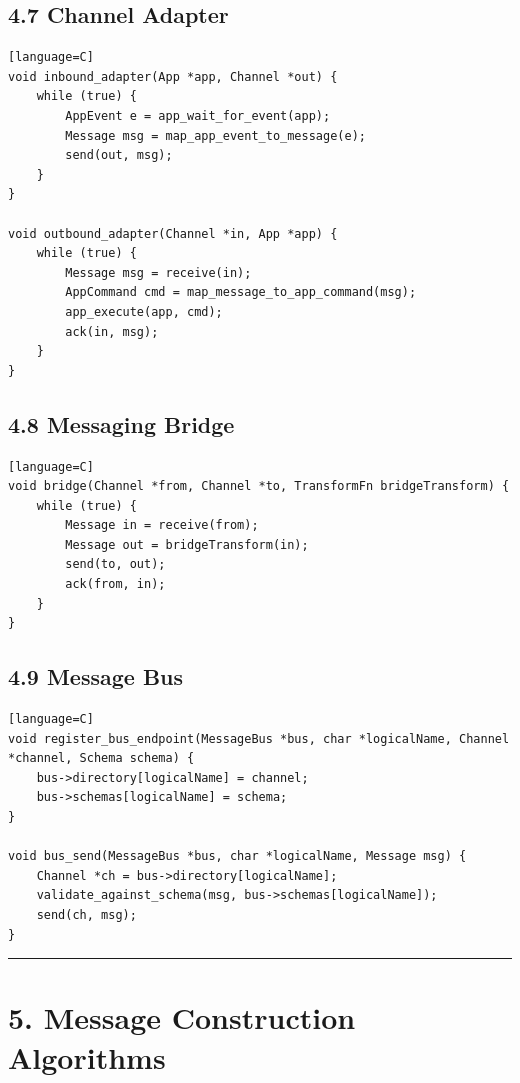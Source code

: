 \documentclass[11pt]{article}
\begin{document}
\subsection{4.7 Channel Adapter}\label{channel-adapter}

\begin{verbatim}[language=C]
void inbound_adapter(App *app, Channel *out) {
    while (true) {
        AppEvent e = app_wait_for_event(app);
        Message msg = map_app_event_to_message(e);
        send(out, msg);
    }
}

void outbound_adapter(Channel *in, App *app) {
    while (true) {
        Message msg = receive(in);
        AppCommand cmd = map_message_to_app_command(msg);
        app_execute(app, cmd);
        ack(in, msg);
    }
}
\end{verbatim}

\subsection{4.8 Messaging Bridge}\label{messaging-bridge}

\begin{verbatim}[language=C]
void bridge(Channel *from, Channel *to, TransformFn bridgeTransform) {
    while (true) {
        Message in = receive(from);
        Message out = bridgeTransform(in);
        send(to, out);
        ack(from, in);
    }
}
\end{verbatim}

\subsection{4.9 Message Bus}\label{message-bus}

\begin{verbatim}[language=C]
void register_bus_endpoint(MessageBus *bus, char *logicalName, Channel *channel, Schema schema) {
    bus->directory[logicalName] = channel;
    bus->schemas[logicalName] = schema;
}

void bus_send(MessageBus *bus, char *logicalName, Message msg) {
    Channel *ch = bus->directory[logicalName];
    validate_against_schema(msg, bus->schemas[logicalName]);
    send(ch, msg);
}
\end{verbatim}

\begin{center}\rule{0.5\linewidth}{0.5pt}\end{center}

\section{5. Message Construction
Algorithms}\label{message-construction-algorithms}
\end{document}

